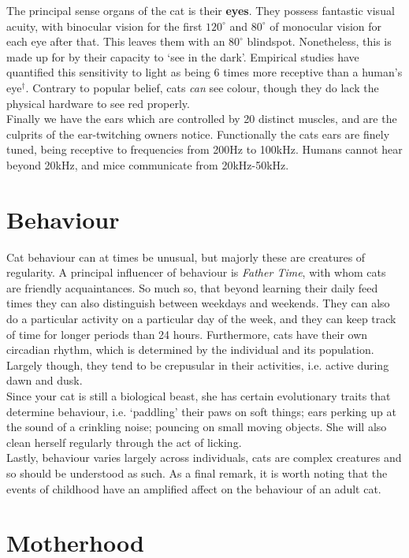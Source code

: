 \documentclass{article}
\begin{document}
The principal sense organs of the cat is their \textbf{eyes}. They possess fantastic visual acuity, with binocular vision for the first \(120^\circ\) and \(80^\circ\) of monocular vision for each eye after that. This leaves them with an \(80^\circ\) blindspot. Nonetheless, this is made up for by their capacity to `see in the dark'. Empirical studies have quantified this sensitivity to light as being 6 times more receptive than a human's eye\(^\dagger\). Contrary to popular belief, cats \emph{can} see colour, though they do lack the physical hardware to see red properly.\\

Finally we have the ears which are controlled by 20 distinct muscles, and are the culprits of the ear-twitching owners notice. Functionally the cats ears are finely tuned, being receptive to frequencies from 200Hz to 100kHz. Humans cannot hear beyond 20kHz, and mice communicate from 20kHz-50kHz. 

\section*{Behaviour}
Cat behaviour can at times be unusual, but majorly these are creatures of regularity. A principal influencer of behaviour is \emph{Father Time}, with whom cats are friendly acquaintances. So much so, that beyond learning their daily feed times they can also distinguish between weekdays and weekends. They can also do a particular activity on a particular day of the week, and they can keep track of time for longer periods than 24 hours. Furthermore, cats have their own circadian rhythm, which is determined by the individual and its population. Largely though, they tend to be crepusular in their activities, i.e. active during dawn and dusk.\\

Since your cat is still a biological beast, she has certain evolutionary traits that determine behaviour, i.e. `paddling' their paws on soft things; ears perking up at the sound of a crinkling noise; pouncing on small moving objects. She will also clean herself regularly through the act of licking.\\

Lastly, behaviour varies largely across individuals, cats are complex creatures and so should be understood as such. As a final remark, it is worth noting that the events of childhood have an amplified affect on the behaviour of an adult cat.

\section*{Motherhood}
\end{document}
